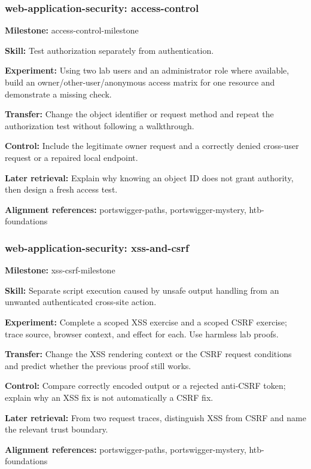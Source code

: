 \subsubsection{web-application-security: access-control}
\noindent\textbf{Milestone:} access-control-milestone\par
\noindent\textbf{Skill:} Test authorization separately from authentication.\par
\noindent\textbf{Experiment:} Using two lab users and an administrator role where available, build an owner/other-user/anonymous access matrix for one resource and demonstrate a missing check.\par
\noindent\textbf{Transfer:} Change the object identifier or request method and repeat the authorization test without following a walkthrough.\par
\noindent\textbf{Control:} Include the legitimate owner request and a correctly denied cross-user request or a repaired local endpoint.\par
\noindent\textbf{Later retrieval:} Explain why knowing an object ID does not grant authority, then design a fresh access test.\par
\noindent\textbf{Alignment references:} portswigger-paths, portswigger-mystery, htb-foundations\par
\subsubsection{web-application-security: xss-and-csrf}
\noindent\textbf{Milestone:} xss-csrf-milestone\par
\noindent\textbf{Skill:} Separate script execution caused by unsafe output handling from an unwanted authenticated cross-site action.\par
\noindent\textbf{Experiment:} Complete a scoped XSS exercise and a scoped CSRF exercise; trace source, browser context, and effect for each. Use harmless lab proofs.\par
\noindent\textbf{Transfer:} Change the XSS rendering context or the CSRF request conditions and predict whether the previous proof still works.\par
\noindent\textbf{Control:} Compare correctly encoded output or a rejected anti-CSRF token; explain why an XSS fix is not automatically a CSRF fix.\par
\noindent\textbf{Later retrieval:} From two request traces, distinguish XSS from CSRF and name the relevant trust boundary.\par
\noindent\textbf{Alignment references:} portswigger-paths, portswigger-mystery, htb-foundations\par
